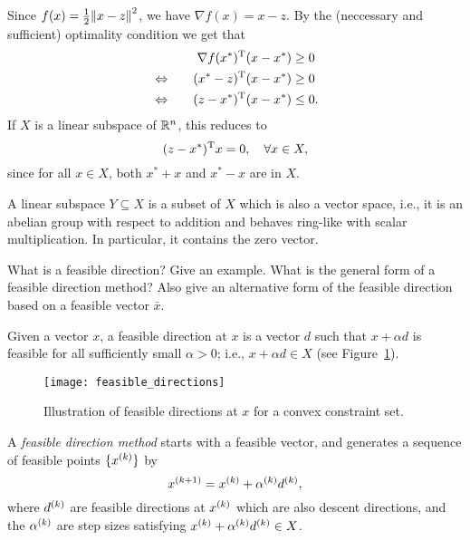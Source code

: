 \documentclass{article}
\begin{document}
Since \(f(x) = \frac{1}{2} \enVert{x - z}^2\), we have \(\nabla f(x) = x - z\).  By the (neccessary
and sufficient) optimality condition we get that
\begin{alignat*}{2}
  &\quad & \T{\nabla f(x^*)}(x - x^*) &\geq 0 \\
  &\Leftrightarrow\quad & \T{(x^* - z)}(x - x^*) &\geq 0 \\
  &\Leftrightarrow\quad & \T{(z - x^*)}(x - x^*) &\leq 0.
\end{alignat*}
If \(X\) is a linear subspace of \(\RR^n\), this reduces to
\begin{equation*}
  \T{(z - x^*)}x = 0, \quad\forall x \in X,
\end{equation*}
since for all \(x \in X\), both \(x^* + x\) and \(x^* - x\) are in \(X\).

A linear subspace \(Y \subseteq X\) is a subset of \(X\) which is also a vector space, i.e., it is
an abelian group with respect to addition and behaves ring-like with scalar multiplication.  In
particular, it contains the zero vector.

\begin{question}
  What is a feasible direction? Give an example.  What is the general form of a feasible direction
  method? Also give an alternative form of the feasible direction based on a feasible vector
  \(\bar{x}\).
\end{question}

Given a vector \(x\), a feasible direction at \(x\) is a vector \(d\) such that \(x + \alpha d\) is
feasible for all sufficiently small \(\alpha > 0\); i.e., \(x + \alpha d \in X\) (see
Figure~\ref{fig:feasible-directions}).

\begin{figure}[H]
  \centering
  \texttt{[image: feasible\_directions]}
  \caption{Illustration of feasible directions at \(x\) for a convex constraint
    set.\label{fig:feasible-directions}}
\end{figure}

A \emph{feasible direction method} starts with a feasible vector, and generates a sequence of
feasible points \(\{\kth{x}\}\) by
\begin{equation*}
  \kth[k+1]{x} = \kth{x} + \kth{\alpha}\kth{d},
\end{equation*}
where \(\kth{d}\) are feasible directions at \(\kth{x}\) which are also descent directions, and the
\(\kth{\alpha}\) are step sizes satisfying \(\kth{x} + \kth{\alpha} \kth{d} \in X\).
\end{document}
